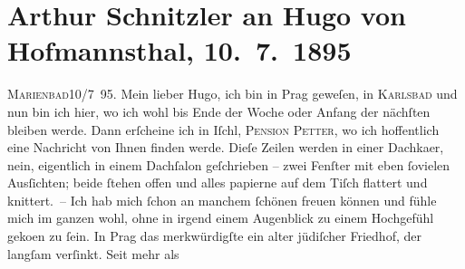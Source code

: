 

               \section[Arthur Schnitzler an Hugo von Hofmannsthal, 10. 7. 1895]{ Arthur Schnitzler an Hugo von Hofmannsthal, 10. 7. 1895}\nopagebreak{}\rehead{ }\begin{ledgroupsized}[t]{13cm}\normalsize\beginnumbering{} \toendnotes[C]{\smallbreak\pagebreak[2]} 
\toendnotes[C]{\smallbreak}\pstart
           \raggedleft{}{\pb}\textsc{Marienbad}10/7 95.\pend
           \pstart{}Mein lieber Hugo,\pend\pstart
           ich bin in Prag geweſen, in \textsc{Karlsbad} und nun bin ich hier, wo ich wohl bis Ende der Woche oder Anfang
                    der nächſten bleiben werde. Dann erſcheine ich in Iſchl,
                            \textsc{Pension Petter}, wo ich hoffentlich eine Nachricht von Ihnen finden werde. Dieſe
                    Zeilen werden in einer Dachka{\geminationm}er, nein, eigentlich
                    in einem Dachſalon geſchrieben – zwei Fenſter mit eben ſovielen Ausſichten;
                    beide ſtehen offen und alles papierne {\pb}auf dem
                    Tiſch flattert und knittert. – Ich hab mich ſchon an manchem ſchönen freuen
                    können und fühle mich im ganzen wohl, ohne in irgend einem Augenblick zu einem
                    Hochgefühl geko{\geminationm}en zu ſein. In Prag das merkwürdigſte ein alter jüdiſcher Friedhof, der langſam verſinkt. Seit mehr als

\end{ledgroupsized}
